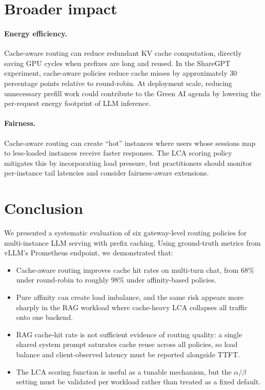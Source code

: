 \documentclass{article}
\begin{document}
\section{Broader impact}
\label{sec:impact}

\paragraph{Energy efficiency.} Cache-aware routing can reduce redundant KV cache computation, directly saving GPU cycles when prefixes are long and reused. In the ShareGPT experiment, cache-aware policies reduce cache misses by approximately 30 percentage points relative to round-robin. At deployment scale, reducing unnecessary prefill work could contribute to the Green AI agenda by lowering the per-request energy footprint of LLM inference.

\paragraph{Fairness.} Cache-aware routing can create ``hot'' instances where users whose sessions map to less-loaded instances receive faster responses. The LCA scoring policy mitigates this by incorporating load pressure, but practitioners should monitor per-instance tail latencies and consider fairness-aware extensions.

\section{Conclusion}
\label{sec:conclusion}

We presented a systematic evaluation of six gateway-level routing policies for multi-instance LLM serving with prefix caching. Using ground-truth metrics from vLLM's Prometheus endpoint, we demonstrated that:
\begin{itemize}
    \item Cache-aware routing improves cache hit rates on multi-turn chat, from 68\% under round-robin to roughly 98\% under affinity-based policies.
    \item Pure affinity can create load imbalance, and the same risk appears more sharply in the RAG workload where cache-heavy LCA collapses all traffic onto one backend.
    \item RAG cache-hit rate is not sufficient evidence of routing quality: a single shared system prompt saturates cache reuse across all policies, so load balance and client-observed latency must be reported alongside TTFT.
    \item The LCA scoring function is useful as a tunable mechanism, but the $\alpha/\beta$ setting must be validated per workload rather than treated as a fixed default.
\end{itemize}
\end{document}
